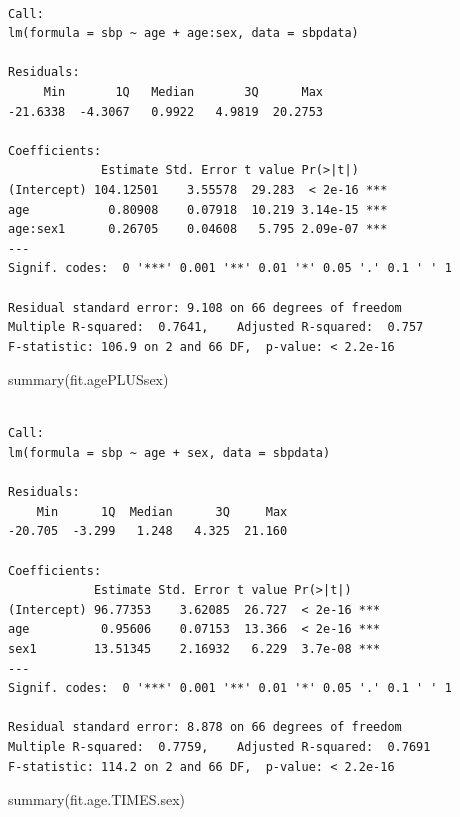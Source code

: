 \documentclass[
  letterpaper,
  DIV=11,
  numbers=noendperiod]{scrreprt}
\newenvironment{Shaded}{\begin{snugshade}}{\end{snugshade}}
\newcommand{\FunctionTok}[1]{\textcolor[rgb]{0.28,0.35,0.67}{#1}}
\newcommand{\NormalTok}[1]{\textcolor[rgb]{0.00,0.23,0.31}{#1}}
\begin{document}
\begin{verbatim}

Call:
lm(formula = sbp ~ age + age:sex, data = sbpdata)

Residuals:
     Min       1Q   Median       3Q      Max 
-21.6338  -4.3067   0.9922   4.9819  20.2753 

Coefficients:
             Estimate Std. Error t value Pr(>|t|)    
(Intercept) 104.12501    3.55578  29.283  < 2e-16 ***
age           0.80908    0.07918  10.219 3.14e-15 ***
age:sex1      0.26705    0.04608   5.795 2.09e-07 ***
---
Signif. codes:  0 '***' 0.001 '**' 0.01 '*' 0.05 '.' 0.1 ' ' 1

Residual standard error: 9.108 on 66 degrees of freedom
Multiple R-squared:  0.7641,    Adjusted R-squared:  0.757 
F-statistic: 106.9 on 2 and 66 DF,  p-value: < 2.2e-16
\end{verbatim}

\begin{Shaded}
\begin{Highlighting}[]
\FunctionTok{summary}\NormalTok{(fit.agePLUSsex)}
\end{Highlighting}
\end{Shaded}

\begin{verbatim}

Call:
lm(formula = sbp ~ age + sex, data = sbpdata)

Residuals:
    Min      1Q  Median      3Q     Max 
-20.705  -3.299   1.248   4.325  21.160 

Coefficients:
            Estimate Std. Error t value Pr(>|t|)    
(Intercept) 96.77353    3.62085  26.727  < 2e-16 ***
age          0.95606    0.07153  13.366  < 2e-16 ***
sex1        13.51345    2.16932   6.229  3.7e-08 ***
---
Signif. codes:  0 '***' 0.001 '**' 0.01 '*' 0.05 '.' 0.1 ' ' 1

Residual standard error: 8.878 on 66 degrees of freedom
Multiple R-squared:  0.7759,    Adjusted R-squared:  0.7691 
F-statistic: 114.2 on 2 and 66 DF,  p-value: < 2.2e-16
\end{verbatim}

\begin{Shaded}
\begin{Highlighting}[]
\FunctionTok{summary}\NormalTok{(fit.age.TIMES.sex)}
\end{Highlighting}
\end{Shaded}
\end{document}
